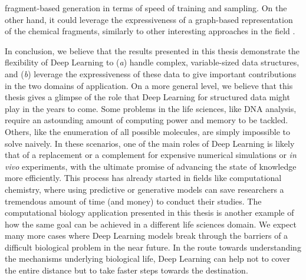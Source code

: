 fragment-based generation in terms of speed of training and sampling. On the other hand, it could leverage the expressiveness of a graph-based representation of the chemical fragments, similarly to other interesting approaches in the field \citep{jin2019multimodalmoltranslation,bradshaw2020barking}.
\vspace{1em}

In conclusion, we believe that the results presented in this thesis demonstrate the flexibility of Deep Learning to (\emph{a}) handle complex, variable-sized data structures, and (\emph{b}) leverage the expressiveness of these data to give important contributions in the two domains of application. On a more general level, we believe that this thesis gives a glimpse of the role that Deep Learning for structured data might play in the years to come. Some problems in the life sciences, like DNA analysis, require an astounding amount of computing power and memory to be tackled. Others, like the enumeration of all possible molecules, are simply impossible to solve naively. In these scenarios, one of the main roles of Deep Learning is likely that of a replacement or a complement for expensive numerical simulations or \emph{in vivo} experiments, with the ultimate promise of advancing the state of knowledge more efficiently. This process has already started in fields like computational chemistry, where using predictive or generative models can save researchers a tremendous amount of time (and money) to conduct their studies. The computational biology application presented in this thesis is another example of how the same goal can be achieved in a different life sciences domain. We expect many more cases where Deep Learning models break through the barriers of a difficult biological problem in the near future. In the route towards understanding the mechanisms underlying biological life, Deep Learning can help not to cover the entire distance but to take faster steps towards the destination.